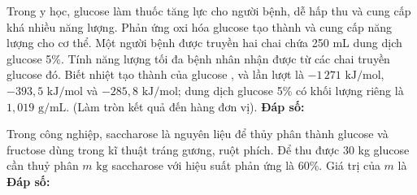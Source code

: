 \documentclass[12pt,a4paper]{article}
\begin{document}
\begin{ex}
Trong y học, glucose làm thuốc tăng lực cho người bệnh, dễ hấp thu và cung cấp khá nhiều năng lượng. Phản ứng oxi hóa glucose tạo thành  và  cung cấp năng lượng cho cơ thể. Một người bệnh được truyền hai chai chứa 250 mL dung dịch glucose 5\%. Tính năng lượng tối đa bệnh nhân nhận được từ các chai truyền glucose đó. Biết nhiệt tạo thành của glucose ,  và  lần lượt là $-1\,271\text{ kJ/mol}$, $-393{,}5\text{ kJ/mol}$ và $-285{,}8\text{ kJ/mol}$; dung dịch glucose 5\% có khối lượng riêng là $1{,}019\text{ g/mL}$. (Làm tròn kết quả đến hàng đơn vị).
\noindent\textbf{Đáp số: \color{hfRed}{397}}
\end{ex}

\begin{ex}
Trong công nghiệp, saccharose là nguyên liệu để thủy phân thành glucose và fructose dùng trong kĩ thuật tráng gương, ruột phích. Để thu được 30 kg glucose cần thuỷ phân $m\text{ kg}$ saccharose với hiệu suất phản ứng là 60\%. Giá trị của $m$ là
\noindent\textbf{Đáp số: \color{hfRed}{95}}
\end{ex}
\end{document}
